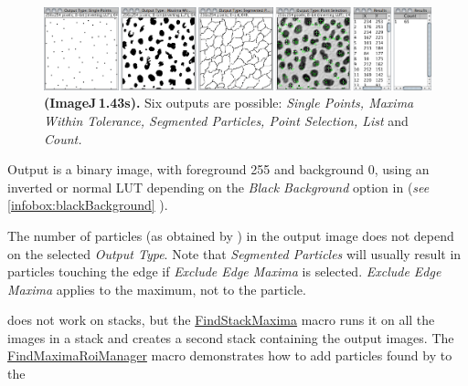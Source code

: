 \begin{figure}
\noindent \includegraphics[width=1\columnwidth]{images/FindMaximaOutputTypes}\caption[\textsf{\protect{}}\ outputs]{\textsf{\label{Flo:Maxima-outputs}}\textbf{\protect{}
(ImageJ\,1.43s). }Six outputs\textbf{ }are possible:\emph{ Single
Points, Maxima Within Tolerance, Segmented Particles, Point Selection,
List }and \emph{Count.}}
\end{figure}


Output is a binary image, with foreground 255 and background 0, using
an inverted or normal LUT depending on the \emph{Black Background}
option in 
(\emph{see} \ref{infobox:blackBackground} ).

The number of particles (as obtained by )
in the output image does not depend on the selected \emph{Output Type}.
Note that \emph{Segmented Particles} will usually result in particles
touching the edge if \emph{Exclude Edge Maxima} is selected. \emph{Exclude
Edge Maxima} applies to the maximum, not to the particle.

 does not work on stacks,
but the \href{http://imagej.nih.gov/ij/macros/FindStackMaxima.txt}{FindStackMaxima}
macro runs it on all the images in a stack and creates a second stack
containing the output images. The \href{http://imagej.nih.gov/ij/macros/examples/FindMaximaRoiManager.txt}{FindMaximaRoiManager}
macro demonstrates how to add particles found by 
to the 

